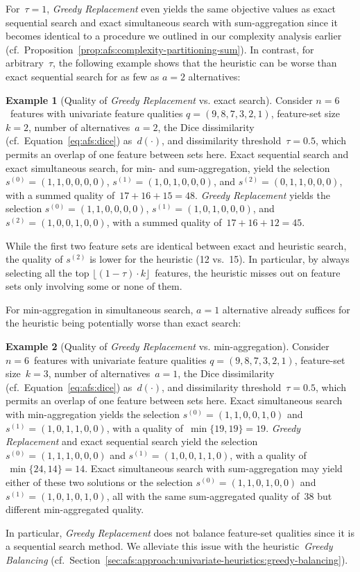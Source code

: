 \documentclass{article}
\theoremstyle{definition}
\newtheorem{example}{Example}
\begin{document}
%
For~$\tau = 1$, \emph{Greedy Replacement} even yields the same objective values as exact sequential search and exact simultaneous search with sum-aggregation since it becomes identical to a procedure we outlined in our complexity analysis earlier (cf.~Proposition~\ref{prop:afs:complexity-partitioning-sum}).
In contrast, for arbitrary~$\tau$, the following example shows that the heuristic can be worse than exact sequential search for as few as $a=2$ alternatives:
%
\begin{example}[Quality of \emph{Greedy Replacement} vs. exact search]
	Consider $n=6$~features with univariate feature qualities $q = (9,8,7,3,2,1)$, feature-set size $k=2$, number of alternatives~$a=2$, the Dice dissimilarity (cf.~Equation~\ref{eq:afs:dice}) as~$d(\cdot)$, and dissimilarity threshold~$\tau = 0.5$, which permits an overlap of one feature between sets here.
	Exact sequential search and exact simultaneous search, for min- and sum-aggregation, yield the selection $s^{(0)} = (1,1,0,0,0,0)$, $s^{(1)} = (1,0,1,0,0,0)$, and $s^{(2)} = (0,1,1,0,0,0)$, with a summed quality of $\,17+16+15=48$.
	\emph{Greedy Replacement} yields the selection $s^{(0)} = (1,1,0,0,0,0)$, $s^{(1)} = (1,0,1,0,0,0)$, and $s^{(2)} = (1,0,0,1,0,0)$, with a summed quality of $\,17+16+12=45$.
	\label{ex:afs:greedy-replacement:worse-than-exact}
\end{example}
%
While the first two feature sets are identical between exact and heuristic search, the quality of $s^{(2)}$ is lower for the heuristic (12 vs.~15).
In particular, by always selecting all the top $\lfloor (1 - \tau) \cdot k \rfloor$~features, the heuristic misses out on feature sets only involving some or none of them.

For min-aggregation in simultaneous search, $a=1$ alternative already suffices for the heuristic being potentially worse than exact search:
%
\begin{example}[Quality of \emph{Greedy Replacement} vs. min-aggregation]
	Consider $n=6$~features with univariate feature qualities $q = (9,8,7,3,2,1)$, feature-set size~$k=3$, number of alternatives~$a=1$, the Dice dissimilarity (cf.~Equation~\ref{eq:afs:dice}) as~$d(\cdot)$, and dissimilarity threshold~$\tau = 0.5$, which permits an overlap of one feature between sets here.
	Exact simultaneous search with min-aggregation yields the selection $s^{(0)} = (1,1,0,0,1,0)$ and $s^{(1)} = (1,0,1,1,0,0)$, with a quality of $\,\min \{19,19\} = 19$.
	\emph{Greedy Replacement} and exact sequential search yield the selection $s^{(0)} = (1,1,1,0,0,0)$ and $s^{(1)} = (1,0,0,1,1,0)$, with a quality of $\,\min \{24,14\} = 14$.
	Exact simultaneous search with sum-aggregation may yield either of these two solutions or the selection $s^{(0)} = (1,1,0,1,0,0)$ and $s^{(1)} = (1,0,1,0,1,0)$, all with the same sum-aggregated quality of~38 but different min-aggregated quality.
	\label{ex:afs:greedy-replacement:worse-than-min-agg}
\end{example}
%
In particular, \emph{Greedy Replacement} does not balance feature-set qualities since it is a sequential search method.
We alleviate this issue with the heuristic~\emph{Greedy Balancing} (cf.~Section~\ref{sec:afs:approach:univariate-heuristics:greedy-balancing}).
\end{document}

